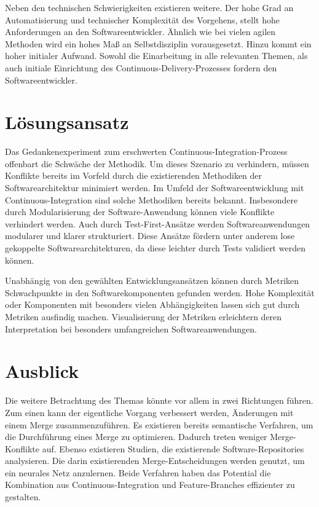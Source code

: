Neben den technischen Schwierigkeiten existieren weitere. Der hohe Grad an Automatisierung und technischer Komplexität des Vorgehens, stellt hohe Anforderungen an den Softwareentwickler. Ähnlich wie bei vielen agilen Methoden wird ein hohes Maß an Selbstdisziplin vorausgesetzt. Hinzu kommt ein hoher initialer Aufwand. Sowohl die Einarbeitung in alle relevanten Themen, als auch initiale Einrichtung des Continuous-Delivery-Prozesses fordern den Softwareentwickler.

\section{Lösungsansatz}

Das Gedankenexperiment zum erschwerten Continuous-Integration-Prozess offenbart die Schwäche der Methodik. Um dieses Szenario zu verhindern, müssen Konflikte bereits im Vorfeld durch die existierenden Methodiken der Softwarearchitektur minimiert werden. Im Umfeld der Softwareentwicklung mit Continuous-Integration sind solche Methodiken bereits bekannt. Insbesondere durch Modularisierung der Software-Anwendung können viele Konflikte verhindert werden. Auch durch Test-First-Ansätze werden Softwareanwendungen modularer und klarer strukturiert. Diese Ansätze fördern unter anderem \glqq lose gekoppelte\grqq{}  Softwarearchitekturen, da diese leichter durch Tests validiert werden können. 

Unabhängig von den gewählten Entwicklungsansätzen können durch Metriken\\ Schwachpunkte in den Softwarekomponenten gefunden werden. Hohe Komplexität oder Komponenten mit besonders vielen Abhängigkeiten lassen sich gut durch Metriken ausfindig machen. Visualisierung der Metriken erleichtern deren Interpretation bei besonders umfangreichen Softwareanwendungen. 

\section{Ausblick}

Die weitere Betrachtung des Themas könnte vor allem in zwei Richtungen führen. Zum einen kann der eigentliche Vorgang verbessert werden, Änderungen mit einem Merge zusammenzuführen. Es existieren bereits semantische Verfahren, um die Durchführung eines Merge zu optimieren. Dadurch treten weniger Merge-Konflikte auf. Ebenso existieren Studien, die existierende Software-Repositories analysieren. Die darin existierenden Merge-Entscheidungen werden genutzt, um ein neurales Netz anzulernen. Beide Verfahren haben das Potential die Kombination aus Continuous-Integration und Feature-Branches effizienter zu gestalten.

